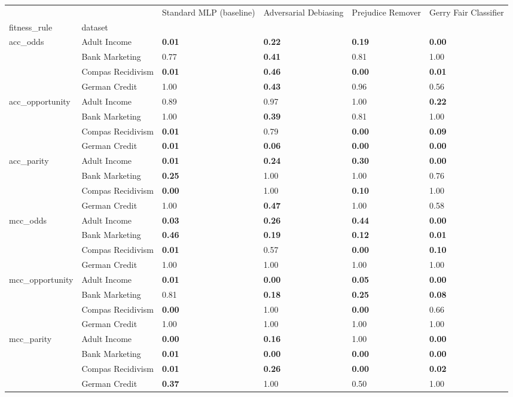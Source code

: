 \begin{tabular}{llllll}
\toprule
 &  & Standard MLP (baseline) & Adversarial Debiasing & Prejudice Remover & Gerry Fair Classifier \\
fitness_rule & dataset &  &  &  &  \\
\midrule
\multirow[t]{4}{*}{acc_odds} & Adult Income & \textbf{0.01} & \textbf{0.22} & \textbf{0.19} & \textbf{0.00} \\
 & Bank Marketing & 0.77 & \textbf{0.41} & 0.81 & 1.00 \\
 & Compas Recidivism & \textbf{0.01} & \textbf{0.46} & \textbf{0.00} & \textbf{0.01} \\
 & German Credit & 1.00 & \textbf{0.43} & 0.96 & 0.56 \\
\cline{1-6}
\multirow[t]{4}{*}{acc_opportunity} & Adult Income & 0.89 & 0.97 & 1.00 & \textbf{0.22} \\
 & Bank Marketing & 1.00 & \textbf{0.39} & 0.81 & 1.00 \\
 & Compas Recidivism & \textbf{0.01} & 0.79 & \textbf{0.00} & \textbf{0.09} \\
 & German Credit & \textbf{0.01} & \textbf{0.06} & \textbf{0.00} & \textbf{0.00} \\
\cline{1-6}
\multirow[t]{4}{*}{acc_parity} & Adult Income & \textbf{0.01} & \textbf{0.24} & \textbf{0.30} & \textbf{0.00} \\
 & Bank Marketing & \textbf{0.25} & 1.00 & 1.00 & 0.76 \\
 & Compas Recidivism & \textbf{0.00} & 1.00 & \textbf{0.10} & 1.00 \\
 & German Credit & 1.00 & \textbf{0.47} & 1.00 & 0.58 \\
\cline{1-6}
\multirow[t]{4}{*}{mcc_odds} & Adult Income & \textbf{0.03} & \textbf{0.26} & \textbf{0.44} & \textbf{0.00} \\
 & Bank Marketing & \textbf{0.46} & \textbf{0.19} & \textbf{0.12} & \textbf{0.01} \\
 & Compas Recidivism & \textbf{0.01} & 0.57 & \textbf{0.00} & \textbf{0.10} \\
 & German Credit & 1.00 & 1.00 & 1.00 & 1.00 \\
\cline{1-6}
\multirow[t]{4}{*}{mcc_opportunity} & Adult Income & \textbf{0.01} & \textbf{0.00} & \textbf{0.05} & \textbf{0.00} \\
 & Bank Marketing & 0.81 & \textbf{0.18} & \textbf{0.25} & \textbf{0.08} \\
 & Compas Recidivism & \textbf{0.00} & 1.00 & \textbf{0.00} & 0.66 \\
 & German Credit & 1.00 & 1.00 & 1.00 & 1.00 \\
\cline{1-6}
\multirow[t]{4}{*}{mcc_parity} & Adult Income & \textbf{0.00} & \textbf{0.16} & 1.00 & \textbf{0.00} \\
 & Bank Marketing & \textbf{0.01} & \textbf{0.00} & \textbf{0.00} & \textbf{0.00} \\
 & Compas Recidivism & \textbf{0.01} & \textbf{0.26} & \textbf{0.00} & \textbf{0.02} \\
 & German Credit & \textbf{0.37} & 1.00 & 0.50 & 1.00 \\
\cline{1-6}
\bottomrule
\end{tabular}
